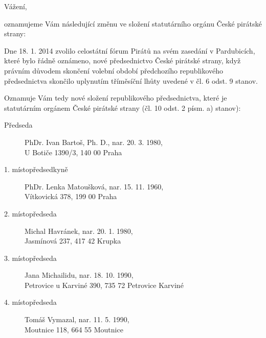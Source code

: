\documentclass[11pt,a4paper,czech]{article}
\begin{document}
\from[]{}


\def \yoursign {č. j. MV-39553-7/VS-2009}
\def \yourdate {}
\def \oursign {RP 1/2014}
\def \place {Praha}

\vspace*{0.5cm}
\printheader

\subject{Změna členů statutárního orgánu}

Vážení,

oznamujeme Vám následující změnu ve složení statutárního orgánu České pirátské strany:

Dne 18. 1. 2014 zvolilo celostátní fórum Pirátů na svém zasedání v Pardubicích, které bylo řádně oznámeno, nové předsednictvo České pirátské strany, když právním důvodem skončení volební období předchozího republikového předsednictva skončilo uplynutím tříměsíční lhůty uvedené v čl. 6 odst. 9 stanov. 

Oznamuje Vám tedy nové složení republikového předsednictva, které je statutárním orgánem České pirátské strany (čl. 10 odst. 2 písm. a) stanov):

\begin{description}
\item[Předseda]{PhDr. Ivan Bartoš, Ph. D., nar. 20. 3. 1980, \\ U Botiče 1390/3, 140 00 Praha}
\item[1. místopředsedkyně]{PhDr. Lenka Matoušková, nar. 15. 11. 1960, \\ Vítkovická 378, 199 00 Praha}
\item[2. místopředseda]{Michal Havránek, nar. 20. 1. 1980, \\ Jasmínová 237, 417 42 Krupka}
\item[3. místopředseda]{Jana Michailidu, nar. 18. 10. 1990, \\ Petrovice u Karviné 390, 735 72 Petrovice Karviné}
\item[4. místopředseda]{Tomáš Vymazal, nar. 11. 5. 1990, \\ Moutnice 118, 664 55 Moutnice}
\end{description}
\end{document}
